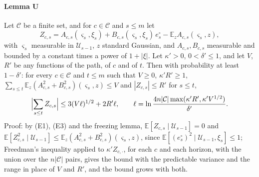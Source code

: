 \documentclass[11pt]{amsart}
\theoremstyle{definition}
\numberwithin{equation}{section}
\newcommand{\E}{\mathbb{E}}
\begin{document}
\paragraph{Lemma U} Let $\mathcal C$ be a finite set, and for $c\in\mathcal C$ and $s\le m$ let
\[
Z_{c,s}=A_{c,s}(\varsigma_s,\xi_s)+B_{c,s}(\varsigma_s,\xi_s)\,e^\circ_s-\E_z A_{c,s}(\varsigma_s,z),
\]
with $\varsigma_s$ measurable in $\mathcal U_{s-1}$, $z$ standard Gaussian, and $A_{c,s},B_{c,s}$ measurable and bounded by a constant times a power of $1+|\xi|$. Let $\kappa'>0$, $0<\delta'\le1$, and let $V$, $R'$ be any functions of the path, of $c$ and of $t$. Then with probability at least $1-\delta'$: for every $c\in\mathcal C$ and $t\le m$ such that $V\ge0$, $\kappa'R'\ge1$, $\sum_{s\le t}\E_z(A_{c,s}^2+B_{c,s}^2)(\varsigma_s,z)\le V$ and $|Z_{c,s}|\le R'$ for $s\le t$,
\[
\Bigl|\sum_{s\le t}Z_{c,s}\Bigr|\le3(V\ell)^{1/2}+2R'\ell,\qquad\ell=\ln\frac{4n|\mathcal C|\max(\kappa'R',\kappa'V^{1/2})}{\delta'}.
\]
Proof: by (E1), (E3) and the freezing lemma, $\E[Z_{c,s}\mid\mathcal U_{s-1}]=0$ and $\E[Z_{c,s}^2\mid\mathcal U_{s-1}]\le\E_z(A_{c,s}^2+B_{c,s}^2)(\varsigma_s,z)$, since $\E[(e^\circ_s)^2\mid\mathcal U_{s-1},\xi_s]\le1$; Freedman's inequality applied to $\kappa'Z_{c,\cdot}$, for each $c$ and each horizon, with the union over the $n|\mathcal C|$ pairs, gives the bound with the predictable variance and the range in place of $V$ and $R'$, and the bound grows with both.
\end{document}

